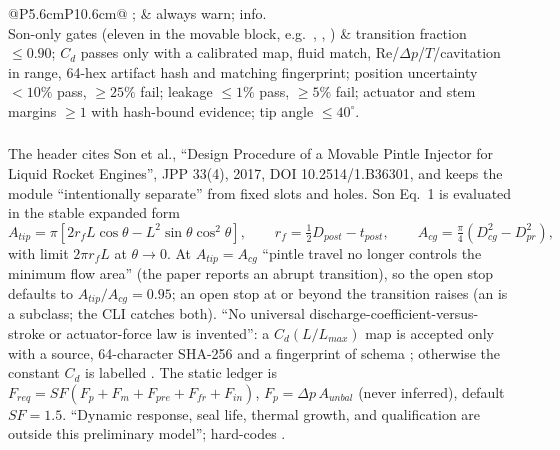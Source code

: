{\begin{longtable}{@{}P{5.6cm}P{10.6cm}@{}}
;  & always warn; info. \\
Son-only gates (eleven in the movable block, e.g.\ , , ) & transition fraction $\le0.90$; $C_d$ passes only with a calibrated map, fluid match, Re/$\Delta p$/$T$/cavitation in range, 64-hex artifact hash and matching fingerprint; position uncertainty $<10\%$ pass, $\ge25\%$ fail; leakage $\le1\%$ pass, $\ge5\%$ fail; actuator and stem margins $\ge1$ with hash-bound evidence; tip angle $\le40^\circ$. \\
\bottomrule
\end{longtable}}

\subsubsection*{}

The header cites Son et al., ``Design Procedure of a Movable Pintle Injector for
Liquid Rocket Engines'', JPP 33(4), 2017, DOI 10.2514/1.B36301, and keeps the
module ``intentionally separate'' from fixed slots and holes. Son Eq.~1 is
evaluated in the stable expanded form
\begin{equation*}
A_{tip}=\pi\left[2r_fL\cos\theta-L^2\sin\theta\cos^2\theta\right],\qquad
r_f=\tfrac12D_{post}-t_{post},\qquad
A_{cg}=\tfrac{\pi}{4}(D_{cg}^2-D_{pr}^2),
\end{equation*}
with limit $2\pi r_fL$ at $\theta\to0$. At $A_{tip}=A_{cg}$ ``pintle travel no
longer controls the minimum flow area'' (the paper reports an abrupt transition),
so the open stop defaults to $A_{tip}/A_{cg}=0.95$; an open stop at or beyond the transition
raises  (an  is a  subclass; the CLI catches both). ``No universal discharge-coefficient-versus-stroke
or actuator-force law is invented'': a $C_d(L/L_{max})$ map is accepted only with a
source, 64-character SHA-256 and a fingerprint of schema
; otherwise the constant $C_d$ is
labelled . The static ledger is
$F_{req}=SF(F_p+F_m+F_{pre}+F_{fr}+F_{in})$, $F_p=\Delta p\,A_{unbal}$ (never
inferred), default $SF=1.5$. ``Dynamic response, seal life, thermal growth, and
qualification are outside this preliminary model'';  hard-codes
.

\subsubsection*{}

